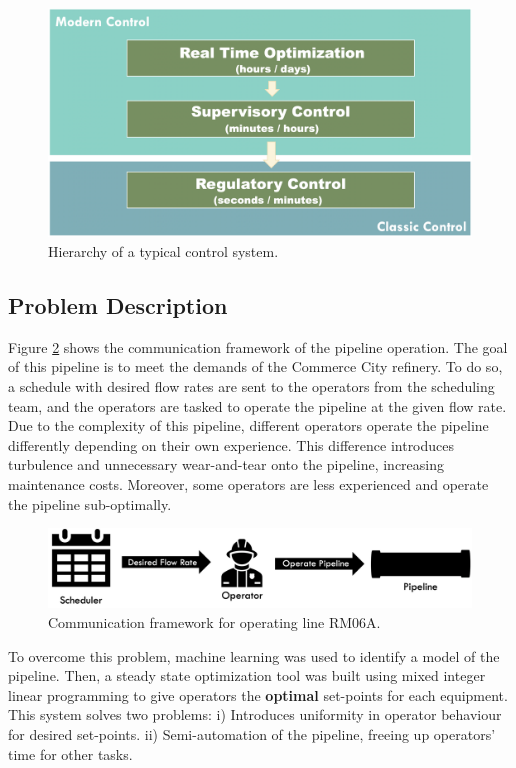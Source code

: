 \begin{figure}[h]
    \centering
    \includegraphics[scale=0.15]{images/08APC.png}
    \caption{Hierarchy of a typical control system.}
    \label{fig:08APC}
\end{figure}

\subsection{Problem Description}
Figure \ref{fig:08schedule} shows the communication framework of the pipeline operation. The goal of this pipeline is to meet the demands of the Commerce City refinery. To do so, a schedule with desired flow rates are sent to the operators from the scheduling team, and the operators are tasked to operate the pipeline at the given flow rate. Due to the complexity of this pipeline, different operators operate the pipeline differently depending on their own experience.  This difference introduces turbulence and unnecessary wear-and-tear onto the pipeline, increasing maintenance costs. Moreover, some operators are less experienced and operate the pipeline sub-optimally.

\begin{figure}[h]
    \centering
    \includegraphics[scale=0.35]{images/08Schedule.png}
    \caption{Communication framework for operating line RM06A.}
    \label{fig:08schedule}
\end{figure}

To overcome this problem, machine learning was used to identify a model of the pipeline.  Then, a steady state optimization tool was built using mixed integer linear programming to give operators the \textbf{optimal} set-points for each equipment.  This system solves two problems: i) Introduces uniformity in operator behaviour for desired set-points. ii) Semi-automation of the pipeline, freeing up operators' time for other tasks.

